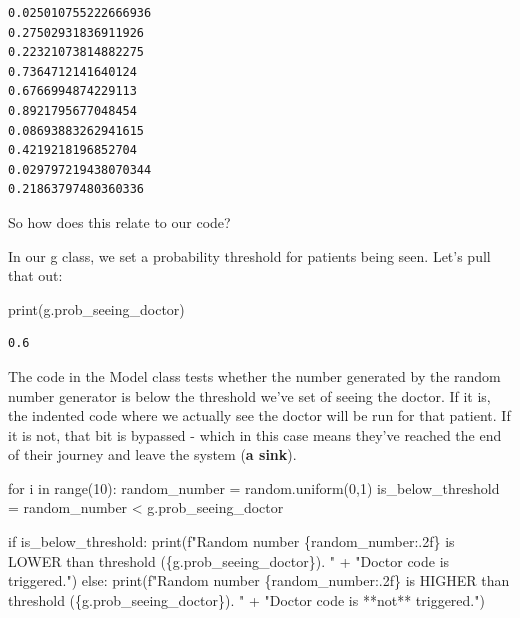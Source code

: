 \documentclass[
  letterpaper,
  DIV=11,
  numbers=noendperiod]{scrreprt}
\newenvironment{Shaded}{}{}
\newcommand{\BuiltInTok}[1]{\textcolor[rgb]{0.84,0.23,0.29}{#1}}
\newcommand{\ControlFlowTok}[1]{\textcolor[rgb]{0.84,0.23,0.29}{#1}}
\newcommand{\DecValTok}[1]{\textcolor[rgb]{0.00,0.36,0.77}{#1}}
\newcommand{\KeywordTok}[1]{\textcolor[rgb]{0.84,0.23,0.29}{#1}}
\newcommand{\NormalTok}[1]{\textcolor[rgb]{0.14,0.16,0.18}{#1}}
\newcommand{\OperatorTok}[1]{\textcolor[rgb]{0.14,0.16,0.18}{#1}}
\newcommand{\SpecialCharTok}[1]{\textcolor[rgb]{0.00,0.36,0.77}{#1}}
\newcommand{\SpecialStringTok}[1]{\textcolor[rgb]{0.01,0.18,0.38}{#1}}
\newcommand{\StringTok}[1]{\textcolor[rgb]{0.01,0.18,0.38}{#1}}
\begin{document}
\begin{verbatim}
0.025010755222666936
0.27502931836911926
0.22321073814882275
0.7364712141640124
0.6766994874229113
0.8921795677048454
0.08693883262941615
0.4219218196852704
0.029797219438070344
0.21863797480360336
\end{verbatim}

So how does this relate to our code?

In our g class, we set a probability threshold for patients being seen.
Let's pull that out:

\begin{Shaded}
\begin{Highlighting}[]
\BuiltInTok{print}\NormalTok{(g.prob\_seeing\_doctor)}
\end{Highlighting}
\end{Shaded}

\begin{verbatim}
0.6
\end{verbatim}

The code in the Model class tests whether the number generated by the
random number generator is below the threshold we've set of seeing the
doctor. If it is, the indented code where we actually see the doctor
will be run for that patient. If it is not, that bit is bypassed - which
in this case means they've reached the end of their journey and leave
the system (\textbf{a sink}).

\begin{Shaded}
\begin{Highlighting}[]
\ControlFlowTok{for}\NormalTok{ i }\KeywordTok{in} \BuiltInTok{range}\NormalTok{(}\DecValTok{10}\NormalTok{):}
\NormalTok{  random\_number }\OperatorTok{=}\NormalTok{ random.uniform(}\DecValTok{0}\NormalTok{,}\DecValTok{1}\NormalTok{)}
\NormalTok{  is\_below\_threshold }\OperatorTok{=}\NormalTok{ random\_number }\OperatorTok{\textless{}}\NormalTok{ g.prob\_seeing\_doctor}

  \ControlFlowTok{if}\NormalTok{ is\_below\_threshold:}
    \BuiltInTok{print}\NormalTok{(}\SpecialStringTok{f"Random number }\SpecialCharTok{\{}\NormalTok{random\_number}\SpecialCharTok{:.2f\}}\SpecialStringTok{ is LOWER than threshold (}\SpecialCharTok{\{}\NormalTok{g}\SpecialCharTok{.}\NormalTok{prob\_seeing\_doctor}\SpecialCharTok{\}}\SpecialStringTok{). "} \OperatorTok{+}
    \StringTok{"Doctor code is triggered."}\NormalTok{)}
  \ControlFlowTok{else}\NormalTok{:}
    \BuiltInTok{print}\NormalTok{(}\SpecialStringTok{f"Random number }\SpecialCharTok{\{}\NormalTok{random\_number}\SpecialCharTok{:.2f\}}\SpecialStringTok{ is HIGHER than threshold (}\SpecialCharTok{\{}\NormalTok{g}\SpecialCharTok{.}\NormalTok{prob\_seeing\_doctor}\SpecialCharTok{\}}\SpecialStringTok{). "} \OperatorTok{+}
    \StringTok{"Doctor code is **not** triggered."}\NormalTok{)}
\end{Highlighting}
\end{Shaded}
\end{document}
